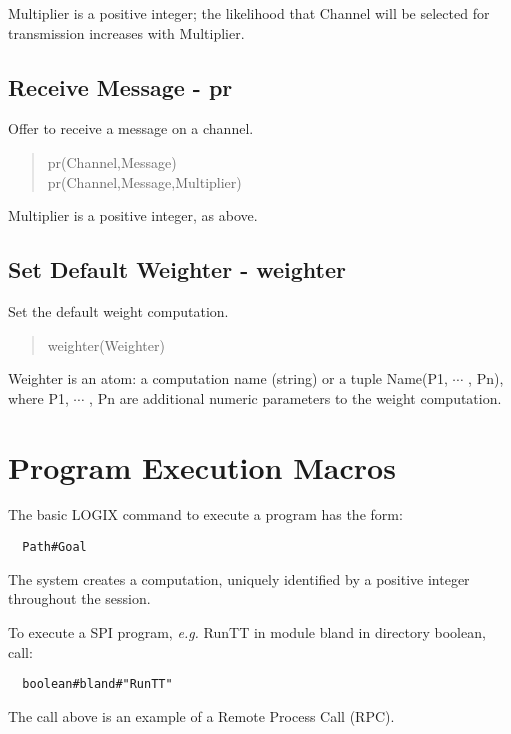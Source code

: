 \noindent
Multiplier is a positive integer;
the likelihood that Channel will be selected for transmission
increases with Multiplier.

\subsection{Receive Message - pr}

Offer to receive a message on a channel.

\begin{verse}
pr(Channel,Message) \\
pr(Channel,Message,Multiplier)
\end{verse}

\noindent
Multiplier is a positive integer, as above.

\subsection{Set Default Weighter - weighter}
\label{weighter macro}

Set the default weight computation.

\begin{verse}
weighter(Weighter)
\end{verse}

\noindent
Weighter  is an atom: a computation name
(string) or a tuple  Name(P1, $\cdots$ , Pn), where P1, $\cdots$ , Pn
are additional numeric parameters to the weight computation.


\section{Program Execution Macros}
\label{macros}

The basic LOGIX command to execute a program has the form:

\begin{verbatim}
  Path#Goal
\end{verbatim}

\noindent
The system creates a computation, uniquely identified by a positive
integer throughout the session.

\noindent
To execute a SPI program, {\em e.g.} RunTT in module bland in directory
boolean, call:

\begin{verbatim}
  boolean#bland#"RunTT"
\end{verbatim}

\noindent
The call above is an example of a Remote Process Call (RPC).


